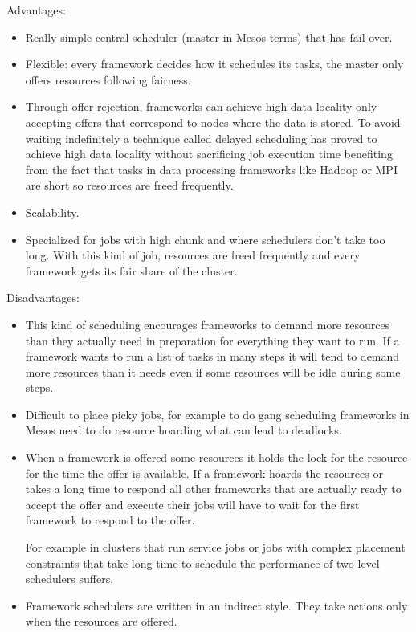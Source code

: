 \documentclass{report}                     %
\begin{document}
Advantages:

\begin{itemize}
  \item
  Really simple central scheduler (master in Mesos terms) that has
  fail-over.
 \item
  Flexible: every framework decides how it schedules its tasks, the
  master only offers resources following fairness.
 \item
  Through offer rejection, frameworks can achieve high data locality
  only accepting offers that correspond to nodes where the data is
  stored. To avoid waiting indefinitely a technique called delayed
  scheduling \cite{zaharia_delay_2010} has proved to achieve high data locality without
  sacrificing job execution time benefiting from the fact that tasks in
  data processing frameworks like Hadoop or MPI are short so resources
  are freed frequently.
 \item Scalability.
 \item Specialized for jobs with high chunk and where schedulers don't take
too long. With this kind of job, resources are freed frequently and
every framework gets its fair share of the cluster.
\end{itemize}

Disadvantages:

\begin{itemize}
 \item This kind of scheduling encourages frameworks to demand more
   resources than they actually need in preparation for everything
   they want to run. If a framework wants to run a list of tasks in
   many steps it will tend to demand more resources than it needs even if
   some resources will be idle during some steps.
 \item Difficult to place picky jobs, for example to do gang scheduling
frameworks in Mesos need to do resource hoarding what can lead to
deadlocks.
 \item When a framework is offered some resources it
holds the lock for the resource for the time the offer is
available. If a framework hoards the resources or takes a long
time to respond all other frameworks that are actually ready to accept
the offer and execute their jobs will have to wait for the first
framework to respond to the offer.

For example in clusters that run service jobs or jobs with complex
placement constraints that take long time to schedule the performance
of two-level schedulers suffers.

 \item Framework schedulers are written in an indirect style. They
  take actions only when the resources are offered.
\end{itemize}
\end{document}
